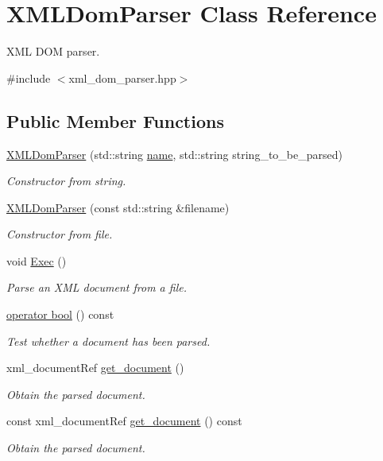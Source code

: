\hypertarget{classXMLDomParser}{}\section{X\+M\+L\+Dom\+Parser Class Reference}
\label{classXMLDomParser}


X\+ML D\+OM parser.  




{\ttfamily \#include $<$xml\+\_\+dom\+\_\+parser.\+hpp$>$}

\subsection*{Public Member Functions}
\begin{DoxyCompactItemize}
\item 
\hyperlink{classXMLDomParser_a19a7034df5eb18d9cedee6b89acafd5e}{X\+M\+L\+Dom\+Parser} (std\+::string \hyperlink{classXMLDomParser_a81d9e7ce6d3eecff046287f925b93218}{name}, std\+::string string\+\_\+to\+\_\+be\+\_\+parsed)
\begin{DoxyCompactList}\small\item\em Constructor from string. \end{DoxyCompactList}\item 
\hyperlink{classXMLDomParser_a263c55a28a8107839837a593c1af5350}{X\+M\+L\+Dom\+Parser} (const std\+::string \&filename)
\begin{DoxyCompactList}\small\item\em Constructor from file. \end{DoxyCompactList}\item 
void \hyperlink{classXMLDomParser_a14355c872e4ffab4ab7e5d94a56c9d4e}{Exec} ()
\begin{DoxyCompactList}\small\item\em Parse an X\+ML document from a file. \end{DoxyCompactList}\item 
\hyperlink{classXMLDomParser_a0f35bed94b75e24953adce591b503cb0}{operator bool} () const
\begin{DoxyCompactList}\small\item\em Test whether a document has been parsed. \end{DoxyCompactList}\item 
xml\+\_\+document\+Ref \hyperlink{classXMLDomParser_a5099f463420bb3831a7fd13e004a3afb}{get\+\_\+document} ()
\begin{DoxyCompactList}\small\item\em Obtain the parsed document. \end{DoxyCompactList}\item 
const xml\+\_\+document\+Ref \hyperlink{classXMLDomParser_aa985e702e37f9ca6885045154ef2f76a}{get\+\_\+document} () const
\begin{DoxyCompactList}\small\item\em Obtain the parsed document. \end{DoxyCompactList}\end{DoxyCompactItemize}
